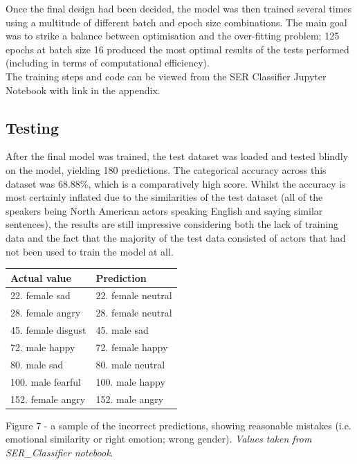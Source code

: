 \documentclass[12pt]{article}
\begin{document}
\noindent Once the final design had been decided, the model was then trained several times using a multitude of different batch and epoch size combinations. The main goal was to strike a balance between optimisation and the over-fitting problem; 125 epochs at batch size 16 produced the most optimal results of the tests performed (including in terms of computational efficiency).
\\

\noindent The training steps and code can be viewed from the SER Classifier Jupyter Notebook with link in the appendix.
\subsection{Testing}
After the final model was trained, the test dataset was loaded and tested blindly on the model, yielding 180 predictions. The categorical accuracy across this dataset was 68.88\%, which is a comparatively high score. Whilst the accuracy is most certainly inflated due to the similarities of the test dataset (all of the speakers being North American actors speaking English and saying similar sentences), the results are still impressive considering both the lack of training data and the fact that the majority of the test data consisted of actors that had not been used to train the model at all. 
\begin{center}
\begin{tabularx}{\textwidth}{ |X|X| }
\hline 
  \textbf{Actual value} & \textbf{Prediction} \\
  \hline
  22. female sad & 22. female neutral \\
  \hline
  28. female angry & 28. female neutral \\
  \hline
  45. female disgust & 45. male sad \\
  \hline
  72. male happy & 72. female happy \\
  \hline
  80. male sad & 80. male neutral \\
  \hline
  100. male fearful & 100. male happy \\
  \hline
  152. female angry & 152. male angry \\
  \hline
\end{tabularx}
\end{center}
Figure 7 - a sample of the incorrect predictions, showing reasonable mistakes (i.e. emotional similarity or right emotion; wrong gender). \textit{Values taken from SER\_Classifier notebook}.
\\
\end{document}

